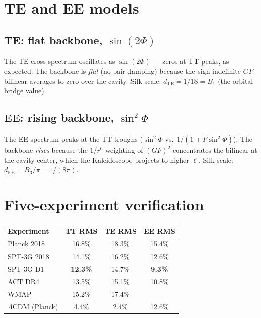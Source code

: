 \documentclass[11pt,letterpaper]{article}
\numberwithin{equation}{section}
\begin{document}
\section{TE and EE models}
\label{sec:te-ee}

\subsection{TE: flat backbone, $\sin(2\Phi)$}

The TE cross-spectrum oscillates as $\sin(2\Phi)$ --- zeros at TT
peaks, as expected.  The backbone is \emph{flat} (no pair damping)
because the sign-indefinite $GF$ bilinear averages to zero over the
cavity.  Silk scale: $d_\mathrm{TE} = 1/18 = B_1$ (the orbital
bridge value).

\subsection{EE: rising backbone, $\sin^2\Phi$}

The EE spectrum peaks at the TT troughs ($\sin^2\Phi$ vs.\
$1/(1 + F\sin^2\Phi)$).  The backbone \emph{rises} because the
$1/r^6$ weighting of $(GF)^2$ concentrates the bilinear at the
cavity center, which the Kaleidoscope projects to higher $\ell$.
Silk scale: $d_\mathrm{EE} = B_3/\pi = 1/(8\pi)$.

\section{Five-experiment verification}
\label{sec:results}

\begin{center}
\begin{tabular}{lccc}
\toprule
Experiment & TT RMS & TE RMS & EE RMS \\
\midrule
Planck 2018       & 16.8\% & 18.3\% & 15.4\% \\
SPT-3G 2018       & 14.1\% & 16.2\% & 12.6\% \\
SPT-3G D1         & \textbf{12.3\%} & 14.7\% & \textbf{9.3\%} \\
ACT DR4           & 13.5\% & 15.1\% & 10.8\% \\
WMAP              & 15.2\% & 17.4\% & --- \\
\midrule
$\Lambda$CDM (Planck) & 4.4\% & 2.4\% & 12.6\% \\
\bottomrule
\end{tabular}
\end{center}
\end{document}
